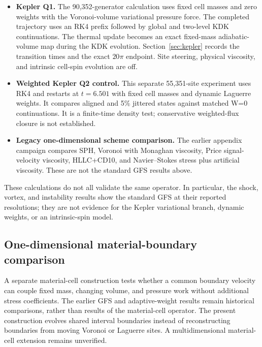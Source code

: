 \documentclass[twocolumn]{aastex63}
\begin{document}
\begin{itemize}
\item \textbf{Kepler Q1.} The 90,352-generator calculation uses fixed
cell masses and zero weights with the Voronoi-volume variational pressure
force. The completed trajectory uses an RK4 prefix followed by global
and two-level KDK continuations. The thermal update becomes an exact
fixed-mass adiabatic-volume map during the KDK evolution. Section~\ref{sec:kepler}
records the transition times and the exact $20\pi$ endpoint.
Site steering, physical viscosity, and intrinsic cell-spin evolution are off.

\item \textbf{Weighted Kepler Q2 control.} This separate 55,351-site
experiment uses RK4 and restarts at $t=6.501$ with fixed cell masses and
dynamic Laguerre weights. It compares aligned and 5\% jittered states against
matched W=0 continuations. It is a finite-time density test; conservative
weighted-flux closure is not established.

\item \textbf{Legacy one-dimensional scheme comparison.} The earlier appendix
campaign compares SPH, Voronoi with Monaghan viscosity, Price
signal-velocity viscosity, HLLC+CD10, and Navier--Stokes stress plus artificial
viscosity. These are not the standard GFS results above.
\end{itemize}

These calculations do not all validate the same operator. In particular, the
shock, vortex, and instability results show the standard GFS at their
reported resolutions; they are not evidence for the Kepler variational branch,
dynamic weights, or an intrinsic-spin model.

\subsection{One-dimensional material-boundary comparison}
\label{sec:material1d}

A separate material-cell construction tests whether a common boundary
velocity can couple fixed mass, changing volume, and pressure work without
additional stress coefficients. The earlier GFS and adaptive-weight results
remain historical comparisons, rather than results of the material-cell
operator. The present construction evolves shared interval boundaries
instead of reconstructing boundaries from moving Voronoi or Laguerre
sites. A multidimensional material-cell extension remains unverified.
\end{document}
